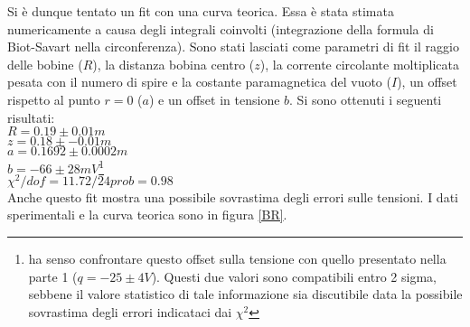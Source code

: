 \documentclass[10pt,a4paper]{article}
\begin{document}
Si è dunque tentato un fit con una curva teorica. Essa è stata stimata numericamente a causa degli integrali coinvolti (integrazione della formula di Biot-Savart nella circonferenza). Sono stati lasciati come parametri di fit il raggio delle bobine ($R$), la distanza bobina centro ($z$), la corrente circolante moltiplicata pesata con il numero di spire e la costante paramagnetica del vuoto ($I$), un offset rispetto al punto $r=0$ ($a$) e un offset in tensione $b$. Si sono ottenuti i seguenti risultati:\\

$R=0.19\pm 0.01 m$\\
$z=0.18\pm-0.01 m$ \\
$a=0.1692 \pm 0.0002 m$\\ 
$b=-66 \pm 28 mV$\footnote{ha senso confrontare questo offset sulla tensione con quello presentato nella parte 1 ($q=-25\pm 4 V$). Questi due valori sono compatibili entro 2 sigma, sebbene il valore statistico di tale informazione sia discutibile data la possibile sovrastima degli errori indicataci dai $\chi^2$}\\
$\chi^2/dof=11.72 / 24 prob= 0.98$\\

Anche questo fit mostra una possibile sovrastima degli errori sulle tensioni. I dati sperimentali e la curva teorica sono in figura \ref{BR}.
\
\end{document}
